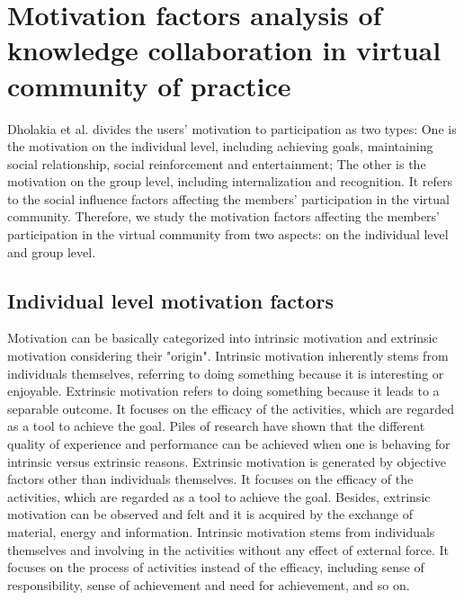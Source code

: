 \documentclass{elsarticle}
\begin{document}
\section{Motivation factors analysis of knowledge collaboration in virtual community of practice}
\label{sec:motiv-fact-analys}


 Dholakia et al. \cite{Dholakia2004241}divides the users’ motivation to participation as two types: One is the motivation on the individual level, including achieving goals, maintaining social relationship, social reinforcement and entertainment; The other is the motivation on the group level, including internalization and recognition. It refers to the social influence factors affecting the members’ participation in the virtual community. Therefore, we study the motivation factors affecting the members’ participation in the virtual community from two aspects: on the individual level and group level.  

\subsection{Individual level motivation factors}
\label{sec:individual-level}

Motivation can be basically categorized into intrinsic motivation and
extrinsic motivation considering their "origin". Intrinsic motivation
inherently  stems from individuals themselves, referring to doing something because it is interesting or enjoyable. Extrinsic motivation refers to doing something
because it leads to a separable outcome.  It focuses on the efficacy
of the activities, which are regarded as a tool to achieve the goal. Piles of research have
shown that the different quality of experience and performance can be achieved
when one is behaving for intrinsic versus extrinsic
reasons\cite{Ryan200054}.  Extrinsic motivation is generated by
objective factors other than individuals themselves. It focuses on the
efficacy of the activities, which are regarded as a tool to achieve
the goal. Besides, extrinsic motivation can be observed and felt and
it is acquired by the exchange of material, energy and
information. Intrinsic motivation stems from individuals themselves
and involving in the activities without any effect of external
force. It focuses on the process of activities instead of the
efficacy, including sense of responsibility, sense of achievement and
need for achievement, and so on. 
\end{document}
